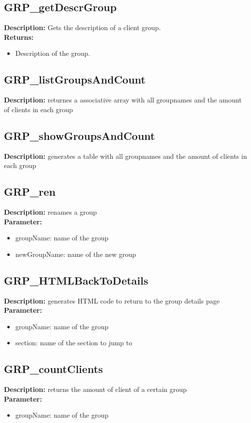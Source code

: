 \subsection{GRP\_getDescrGroup}
\textbf{Description:} Gets the description of a client group.\\
\textbf{Returns:}
\begin{itemize}
\item Description of the group.
\end{itemize}

\subsection{GRP\_listGroupsAndCount}
\textbf{Description:} returnes a associative array with all groupnames and the amount of clients in each group\\

\subsection{GRP\_showGroupsAndCount}
\textbf{Description:} generates a table with all groupnames and the amount of clients in each group\\

\subsection{GRP\_ren}
\textbf{Description:} renames a group\\
\textbf{Parameter:}
\begin{itemize}
\item groupName: name of the group
\item newGroupName: name of the new group
\end{itemize}

\subsection{GRP\_HTMLBackToDetails}
\textbf{Description:} generates HTML code to return to the group details page\\
\textbf{Parameter:}
\begin{itemize}
\item groupName: name of the group
\item section: name of the section to jump to
\end{itemize}

\subsection{GRP\_countClients}
\textbf{Description:} returns the amount of client of a certain group\\
\textbf{Parameter:}
\begin{itemize}
\item groupName: name of the group
\end{itemize}

